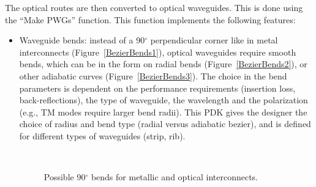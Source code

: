 \documentclass[journal]{spie}
\begin{document}
The optical routes are then converted to optical waveguides.  This is done using the ``Make PWGs'' function.  This function implements the following features:
	\begin{itemize}
		\item Waveguide bends: instead of a 90$^\circ$ perpendicular corner like in metal interconnects (Figure~\ref{BezierBends1}), optical waveguides require smooth bends, which can be in the form on radial bends (Figure~\ref{BezierBends2}), or other adiabatic curves \cite{bogaerts2011compact, cherchi2013dramatic} (Figure~\ref{BezierBends3}).  The choice in the bend parameters is dependent on the performance requirements (insertion loss, back-reflections), the type of waveguide, the wavelength and the polarization (e.g., TM modes require larger bend radii).  This PDK gives the designer the choice of radius and bend type (radial versus adiabatic bezier), and is defined for different types of waveguides (strip, rib).

		\begin{figure}[tbp]		\centering   
		 ~ ~
		 ~ ~
		\caption{Possible 90$^\circ$ bends for metallic and optical interconnects.}
		\label{BezierBends}		\end{figure}	




\end{itemize}
\end{document}
